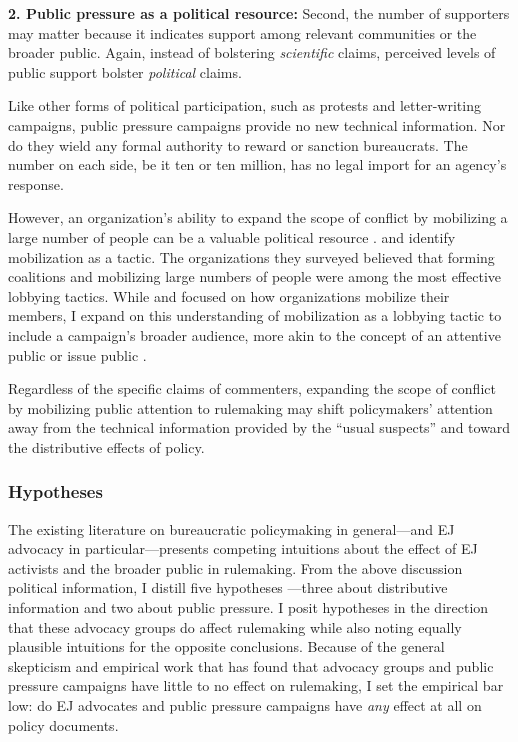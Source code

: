 \documentclass[
      12pt,
        ]{article}
\begin{document}
\textbf{2. Public pressure as a political resource: }
Second, the number of supporters may
matter because it indicates support among relevant communities or the broader public. Again, instead of bolstering \emph{scientific} claims, perceived levels of public support bolster \emph{political} claims.

Like other forms of political participation, such as protests and letter-writing campaigns,
public pressure campaigns provide no new technical information.
Nor do they wield any formal authority to reward or sanction bureaucrats.
The number on each side, be it ten or ten million, has no legal import for an agency's response.

However, an organization's ability to expand the scope of conflict by mobilizing
a large number of people can be a valuable political resource \citep{Schattschneider1975}. \citet{Furlong1997} and \citet{Kerwin2011}
identify mobilization as a tactic. The organizations they surveyed
believed that forming coalitions and mobilizing large numbers of people
were among the most effective lobbying tactics. While \citet{Furlong1997} and \citet{Kerwin2011} focused on how
organizations mobilize their members, I expand on this understanding of mobilization as a lobbying tactic to include a campaign's broader audience, more akin to the concept of
an attentive public \citep{Key1961} or issue public \citep{Converse1964}.

Regardless of the specific claims of commenters, expanding the scope of conflict by mobilizing public attention to rulemaking may shift policymakers' attention away from the technical information provided by the ``usual suspects'' and toward the distributive effects of policy.

\hypertarget{hypotheses}{%
\subsubsection{Hypotheses}\label{hypotheses}}

The existing literature on bureaucratic policymaking in general---and EJ advocacy in particular---presents competing intuitions about the effect of EJ activists and the broader public in rulemaking. From the above discussion political information, I distill five hypotheses ---three about distributive information and two about public pressure. I posit hypotheses in the direction that these advocacy groups do affect rulemaking while also noting equally plausible intuitions for the opposite conclusions. Because of the general skepticism and empirical work that has found that advocacy groups and public pressure campaigns have little to no effect on rulemaking, I set the empirical bar low: do EJ advocates and public pressure campaigns have \emph{any} effect at all on policy documents.
\end{document}
